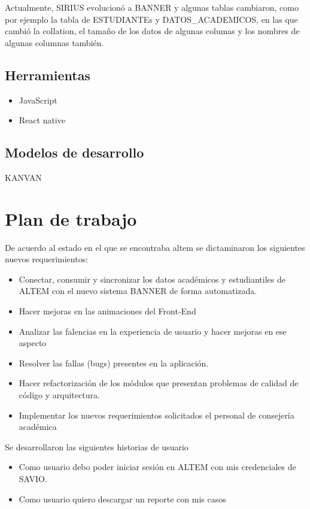 Actualmente, SIRIUS evolucionó a BANNER y algunas tablas cambiaron, como por ejemplo la tabla de ESTUDIANTEs y DATOS\_ACADEMICOS, en las que cambió la collation, el tamaño de los datos de algunas columas y los nombres de algunas columnas también.

\subsection{Herramientas}
    \begin{itemize}
         \item JavaScript
         \item React native
    \end{itemize}
 \subsection{Modelos de desarrollo}
     KANVAN

\section{Plan de trabajo}
De acuerdo al estado en el que se encontraba altem se dictaminaron los siguientes nuevos requerimientos:
\begin{itemize}
    \item Conectar, consumir y sincronizar los datos académicos y estudiantiles de ALTEM con el nuevo sistema BANNER de forma automatizada.
    \item Hacer mejoras en las animaciones del Front-End
    \item Analizar las falencias en la experiencia de usuario y hacer mejoras en ese aspecto
    \item Resolver las fallas (bugs) presentes en la aplicación.
    \item Hacer refactorización de los módulos que presentan problemas de calidad de código y arquitectura.
    \item Implementar los nuevos requerimientos solicitados el personal de consejería académica
\end{itemize}


Se desarrollaron las siguientes historias de usuario 

\begin{itemize}
    \item Como usuario debo poder iniciar sesión en ALTEM con mis credenciales de SAVIO.
    \item Como usuario quiero descargar un reporte con mis casos
    \
\end{itemize}


